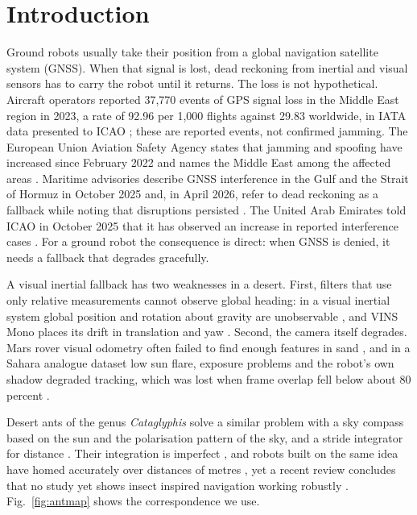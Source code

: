 \documentclass[conference]{IEEEtran}
\begin{document}
\section{Introduction}
Ground robots usually take their position from a global navigation satellite system (GNSS). When that signal is lost, dead reckoning from inertial and visual sensors has to carry the robot until it returns. The loss is not hypothetical. Aircraft operators reported 37,770 events of GPS signal loss in the Middle East region in 2023, a rate of 92.96 per 1,000 flights against 29.83 worldwide, in IATA data presented to ICAO \cite{icao_wp69}; these are reported events, not confirmed jamming. The European Union Aviation Safety Agency states that jamming and spoofing have increased since February 2022 and names the Middle East among the affected areas \cite{easa_sib}. Maritime advisories describe GNSS interference in the Gulf and the Strait of Hormuz in October 2025 \cite{ukmto} and, in April 2026, refer to dead reckoning as a fallback while noting that disruptions persisted \cite{mscio}. The United Arab Emirates told ICAO in October 2025 that it has observed an increase in reported interference cases \cite{uae_icao}. For a ground robot the consequence is direct: when GNSS is denied, it needs a fallback that degrades gracefully.

A visual inertial fallback has two weaknesses in a desert. First, filters that use only relative measurements cannot observe global heading: in a visual inertial system global position and rotation about gravity are unobservable \cite{hesch}, and VINS Mono places its drift in translation and yaw \cite{vinsmono}. Second, the camera itself degrades. Mars rover visual odometry often failed to find enough features in sand \cite{mer}, and in a Sahara analogue dataset low sun flare, exposure problems and the robot's own shadow degraded tracking, which was lost when frame overlap fell below about 80 percent \cite{madmax}.

Desert ants of the genus \emph{Cataglyphis} solve a similar problem with a sky compass based on the sun and the polarisation pattern of the sky, and a stride integrator for distance \cite{ronacher, wittlinger}. Their integration is imperfect \cite{muller88, sommer04}, and robots built on the same idea have homed accurately over distances of metres \cite{stone, antbot}, yet a recent review concludes that no study yet shows insect inspired navigation working robustly \cite{decroon}. Fig.~\ref{fig:antmap} shows the correspondence we use.
\end{document}
